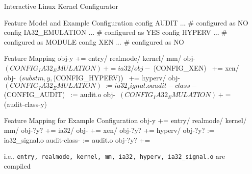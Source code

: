 \begin{frame}[fragile]{\myframetitle}
	\begin{fancycolumns}
		\begin{example}{Interactive Linux Kernel Configurator}
		\end{example}

		\begin{kconfigtight}[basicstyle=\footnotesize]{Feature Model and Example Configuration}
			config AUDIT ... # configured as NO
			config IA32_EMULATION ... # configured as YES
			config HYPERV ... # configured as MODULE
			config XEN ... # configured as NO
\end{kconfigtight}
	\nextcolumn
		\begin{kbuildtight}[basicstyle=\small]{Feature Mapping}
obj-y += entry/ realmode/ kernel/ mm/
obj-~$(CONFIG_IA32_EMULATION)~ += ia32/
obj-~$(CONFIG_XEN)~ += xen/
obj-~$(subst m,y,$(CONFIG_HYPERV))~ += hyperv/
obj-~$(CONFIG_IA32_EMULATION)~ := ia32_signal.o
audit-class-~$(CONFIG_AUDIT)~ := audit.o
obj-~$(CONFIG_IA32_EMULATION)~ += ~$(audit-class-y)~
		\end{kbuildtight}

		\begin{kbuildtight}[basicstyle=\small]{Feature Mapping for Example Configuration}
obj-y += entry/ realmode/ kernel/ mm/
obj-?y? += ia32/
obj- += xen/
obj-?y? += hyperv/
obj-?y? := ia32_signal.o
audit-class- := audit.o
obj-?y? +=
		\end{kbuildtight}

		\begin{note}{}
			\small i.e., \texttt{entry, realmode, kernel, mm, ia32, hyperv, ia32\_signal.o} are compiled
		\end{note}
	\end{fancycolumns}
\end{frame}


